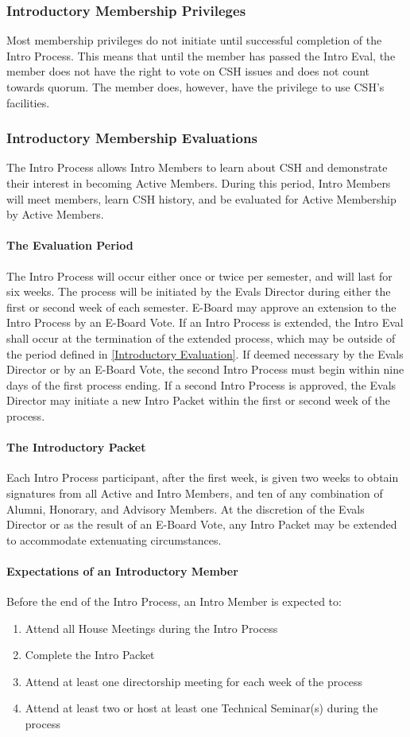 \documentclass{article}
\newcommand{\asubsection}[1]{\subsubsection{#1} \label{#1}}
\newcommand{\asubsubsection}[1]{\paragraph{#1} \label{#1}}
\begin{document}
\asubsection{Introductory Membership Privileges}
Most membership privileges do not initiate until successful completion of the Intro Process.
This means that until the member has passed the Intro Eval, the member does not have the right to vote on CSH issues and does not count towards quorum.
The member does, however, have the privilege to use CSH's facilities.

\asubsection{Introductory Membership Evaluations}
The Intro Process allows Intro Members to learn about CSH and demonstrate their interest in becoming Active Members. During this period, Intro Members will meet members, learn CSH history, and be evaluated for Active Membership by Active Members.

\asubsubsection{The Evaluation Period}
The Intro Process will occur either once or twice per semester, and will last for six weeks.
The process will be initiated by the Evals Director during either the first or second week of each semester. E-Board may approve an extension to the Intro Process by an E-Board Vote.
If an Intro Process is extended, the Intro Eval shall occur at the termination of the extended process, which may be outside of the period defined in \ref{Introductory Evaluation}.
If deemed necessary by the Evals Director or by an E-Board Vote, the second Intro Process must begin within nine days of the first process ending.
If a second Intro Process is approved, the Evals Director may initiate a new Intro Packet within the first or second week of the process.

\asubsubsection{The Introductory Packet}
Each Intro Process participant, after the first week, is given two weeks to obtain signatures from all Active and Intro Members, and ten of any combination of Alumni, Honorary, and Advisory Members.
At the discretion of the Evals Director or as the result of an E-Board Vote, any Intro Packet may be extended to accommodate extenuating circumstances.

\asubsubsection{Expectations of an Introductory Member}
\renewcommand{\theenumi}{\arabic{enumi}} %
Before the end of the Intro Process, an Intro Member is expected to:
\begin{enumerate}
	\item Attend all House Meetings during the Intro Process
	\item Complete the Intro Packet
	\item Attend at least one directorship meeting for each week of the process
	\item Attend at least two or host at least one Technical Seminar(s) during the process
\end{enumerate}
\end{document}
